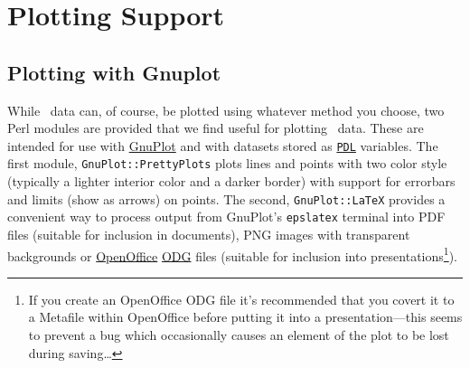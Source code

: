 \chapter{Plotting Support}

\section{Plotting with {\sc Gnuplot}}

While \glc\ data can, of course, be plotted using whatever method you choose, two Perl modules are provided that we find useful for plotting \glc\ data. These are intended for use with \href{http://www.gnuplot.info/}{\sc GnuPlot} and with datasets stored as \href{http://pdl.perl.org/}{\tt PDL} variables. The first module, {\tt GnuPlot::PrettyPlots} plots lines and points with two color style (typically a lighter interior color and a darker border) with support for errorbars and limits (show as arrows) on points. The second, {\tt GnuPlot::LaTeX} provides a convenient way to process output from {\sc GnuPlot}'s {\tt epslatex} terminal into PDF files (suitable for inclusion in documents), PNG images with transparent backgrounds or \href{http://www.openoffice.org/}{OpenOffice} \href{http://www.wikimedia.org/wikipedia/en/wiki/OpenDocument}{ODG} files (suitable for inclusion into presentations\footnote{If you create an OpenOffice ODG file it's recommended that you covert it to a Metafile within OpenOffice before putting it into a presentation---this seems to prevent a bug which occasionally causes an element of the plot to be lost during saving\ldots}).

